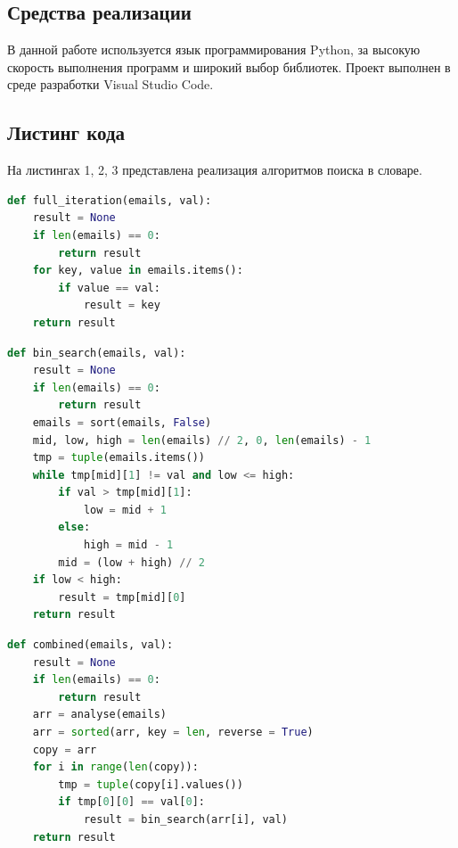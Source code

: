\documentclass[a4paper, 12pt]{article}
\begin{document}
	\subsection{Средства реализации}
	\hspace*{5mm} В данной работе используется язык программирования Python, за высокую скорость выполнения программ и широкий выбор библиотек.\cite{doc} Проект выполнен в среде разработки Visual Studio Code.
	\clearpage
	\newpage 
	\subsection{Листинг кода}
	На листингах 1, 2, 3 представлена реализация алгоритмов поиска в словаре.


	\lstset{style=mystyle}

	\begin{lstlisting}[language=Python, caption = Алгоритм полного перебора]
def full_iteration(emails, val):
	result = None
	if len(emails) == 0:
		return result
	for key, value in emails.items():
		if value == val:
			result = key
	return result
	\end{lstlisting}
\begin{lstlisting}[language=Python, caption = Алгоритм бинарного поиска]
def bin_search(emails, val):
	result = None
	if len(emails) == 0:
		return result
	emails = sort(emails, False)
	mid, low, high = len(emails) // 2, 0, len(emails) - 1
	tmp = tuple(emails.items())
	while tmp[mid][1] != val and low <= high:
		if val > tmp[mid][1]:
			low = mid + 1
		else:
			high = mid - 1
		mid = (low + high) // 2
	if low < high:
		result = tmp[mid][0] 
	return result
\end{lstlisting}
\clearpage
\newpage
\begin{lstlisting}[language=Python, caption = Алгоритм комбинированного поиска]
def combined(emails, val):
	result = None
	if len(emails) == 0:
		return result
	arr = analyse(emails)
	arr = sorted(arr, key = len, reverse = True)
	copy = arr
	for i in range(len(copy)):
		tmp = tuple(copy[i].values())
		if tmp[0][0] == val[0]:
			result = bin_search(arr[i], val) 
	return result 
\end{lstlisting}
\end{document}
